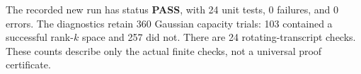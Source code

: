The recorded new run has status \textbf{PASS}, with 24 unit tests, 0 failures, and 0 errors. The diagnostics retain 360 Gaussian capacity trials: 103 contained a successful rank-$k$ space and 257 did not. There are 24 rotating-transcript checks. These counts describe only the actual finite checks, not a universal proof certificate.

